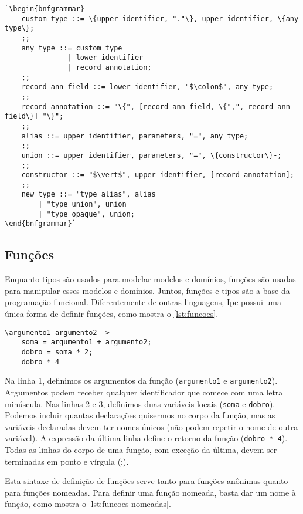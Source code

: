\begin{lstlisting}[label={grammar:custom-types},caption={Definição de novos tipos em EBNF},escapechar=`,numbers=none]
`\begin{bnfgrammar}
    custom type ::= \{upper identifier, "."\}, upper identifier, \{any type\};
    ;;
    any type ::= custom type
               | lower identifier
               | record annotation;
    ;;
    record ann field ::= lower identifier, "$\colon$", any type;
    ;;
    record annotation ::= "\{", [record ann field, \{",", record ann field\}] "\}";
    ;;
    alias ::= upper identifier, parameters, "=", any type;
    ;;
    union ::= upper identifier, parameters, "=", \{constructor\}-;
    ;;
    constructor ::= "$\vert$", upper identifier, [record annotation];
    ;;
    new type ::= "type alias", alias
        | "type union", union
        | "type opaque", union;
\end{bnfgrammar}`
\end{lstlisting}

\subsection{Funções}

Enquanto tipos são usados para modelar modelos e domínios, funções são
usadas para manipular esses modelos e domínios. Juntos, funções e tipos são a
base da programação funcional. Diferentemente de outras linguagens, Ipe possui
uma única forma de definir funções, como mostra o \autoref{lst:funcoes}.

\begin{lstlisting}[label={lst:funcoes},caption={Exemplo de como definir uma função}]
\argumento1 argumento2 ->
    soma = argumento1 + argumento2;
    dobro = soma * 2;
    dobro * 4
\end{lstlisting}

Na linha 1, definimos os argumentos da função (\texttt{argumento1} e \texttt{argumento2}).
Argumentos podem receber qualquer identificador que comece com uma letra minúscula.
Nas linhas 2 e 3, definimos duas variáveis locais (\texttt{soma} e \texttt{dobro}).
Podemos incluir quantas declarações quisermos no corpo da função, mas as variáveis
declaradas devem ter nomes únicos (não podem repetir o nome de outra variável). A
expressão da última linha define o retorno da função (\texttt{dobro * 4}). Todas as linhas do corpo
de uma função, com exceção da última, devem ser terminadas em ponto e vírgula (;).

Esta sintaxe de definição de funções serve tanto para funções anônimas quanto para
funções nomeadas. Para definir uma função nomeada, basta dar um nome à função, como
mostra o \autoref{lst:funcoes-nomeadas}.

